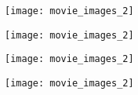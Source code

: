 \documentclass[12pt]{minimal}
\begin{document}
\noindent
{}
\texttt{[image: movie\_images\_2]}
\vspace{0.2cm}

\noindent
{}
\texttt{[image: movie\_images\_2]}
\vspace{0.2cm}

\noindent
{}
\texttt{[image: movie\_images\_2]}
\vspace{0.2cm}

\noindent
{}
\texttt{[image: movie\_images\_2]}
\end{document}
